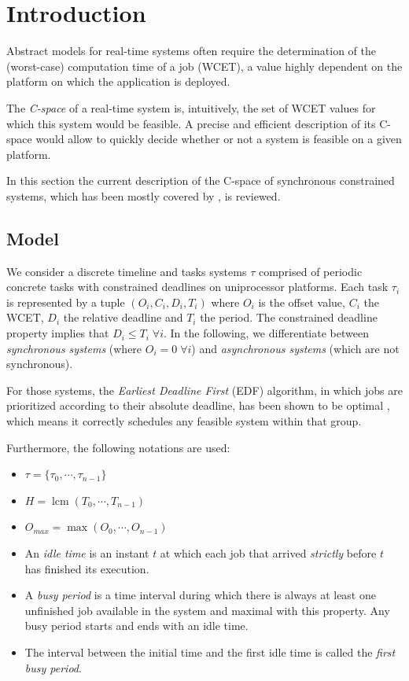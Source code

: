 \documentclass[conference]{IEEEtran}
\begin{document}
\section{Introduction}

	Abstract models for real-time systems often require the determination of the
	(worst-case) computation time of a job (WCET), a value highly dependent on the
	platform on which the application is deployed.

	The \emph{C-space} of a real-time system is, intuitively,
	the set of WCET values for which this system would be feasible. A
	precise and efficient description of its C-space would allow to quickly decide
	whether or not a system is feasible on a given platform.

	In this section the current description of the C-space of synchronous
	constrained systems, which has been mostly covered by \cite{george2009characterization}, is reviewed.

	\subsection{Model}

		We consider a discrete timeline and tasks systems $\tau$ comprised of periodic concrete
		tasks with constrained deadlines on uniprocessor platforms. Each task
		$\tau_i$ is represented by a tuple $(O_i, C_i, D_i, T_i)$ where $O_i$ is the offset value,
		$C_i$ the WCET, $D_i$ the relative deadline and $T_i$ the period.
		The constrained deadline property implies that $D_i \leq T_i \; \forall i$. In
		the following, we differentiate between \emph{synchronous systems} (where $O_i
		= 0 \; \forall i$) and \emph{asynchronous systems} (which are not synchronous).

		For those systems, the \emph{Earliest Deadline First} (EDF) algorithm, in
		which jobs are prioritized according to their absolute deadline, has been
		shown to be optimal \cite{liu1973scheduling}, which means it
		correctly schedules any feasible system within that group.

		Furthermore, the following notations are used:
		\begin{itemize}
			\item $\tau = \{\tau_0, \cdots, \tau_{n-1}\}$
			\item $H = \operatorname{lcm}(T_0, \cdots, T_{n-1})$
			\item $O_{max} = \max (O_0, \cdots, O_{n-1})$
			\item An \emph{idle time} is an instant $t$ at which each job that arrived
			\emph{strictly} before $t$ has finished its execution.
			\item A \emph{busy period} is a time interval during which there is always
			at least one unfinished job available in the system and maximal
			with this property. Any busy period starts and ends
			with an idle time.
			\item The interval between the initial time and the first
			idle time is called the \emph{first busy period}.
		\end{itemize}
\end{document}
